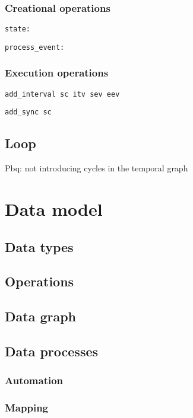 \documentclass[a4paper]{article}
\begin{document}
\subsubsection{Creational operations}
\begin{lstlisting}
state:
\end{lstlisting}

\begin{lstlisting}
process_event:
\end{lstlisting}

\subsubsection{Execution operations}
\begin{lstlisting}
add_interval sc itv sev eev
\end{lstlisting}
\begin{lstlisting}
add_sync sc
\end{lstlisting}

\subsection{Loop}
Pbq: not introducing cycles in the temporal graph
\section{Data model}

\subsection{Data types}
\subsection{Operations}
\subsection{Data graph}
\subsection{Data processes}
\subsubsection{Automation}
\subsubsection{Mapping}
\end{document}
